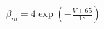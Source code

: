 \documentclass[preview]{standalone}
\begin{document}
\begin{align*}
\beta_m = 4 \exp \left( -\frac{V + 65}{18} \right)
\end{align*}
\end{document}
